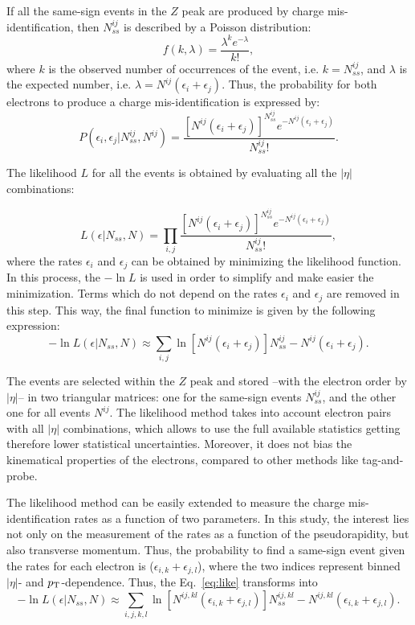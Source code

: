 If all the same-sign events in the $Z$ peak are produced by charge mis-identification, then $N^{ij}_{ss}$ is described by a Poisson distribution:
\begin{equation}
f(k,\lambda)=\frac{\lambda^k e^{-\lambda}}{k!},
\end{equation}
where $k$ is the observed number of occurrences of the event, i.e. $k=N^{ij}_{ss}$, and $\lambda$ is the expected number,  i.e. $\lambda=N^{ij}(\epsilon_i+\epsilon_j)$. Thus, the probability for both electrons to produce a charge mis-identification is expressed by:
\begin{equation}
P(\epsilon_i,\epsilon_j|N^{ij}_{ss},N^{ij})=\frac{[N^{ij}(\epsilon_i+\epsilon_j)]^{N_{ss}^{ij}}e^{-N^{ij}(\epsilon_i+\epsilon_j)}}{N^{ij}_{ss}!}.
\end{equation}

The likelihood $L$ for all the events is obtained by evaluating all the $|\eta|$ combinations:

\begin{equation}
L(\epsilon|N_{ss},N)=\prod_{i,j}\frac{[N^{ij}(\epsilon_i+\epsilon_j)]^{N_{ss}^{ij}}e^{-N^{ij}(\epsilon_i+\epsilon_j)}}{N^{ij}_{ss}!},
\end{equation}
where the rates $\epsilon_i$ and $\epsilon_j$ can be obtained by minimizing the likelihood function. In this process, the $-\ln L$ is used in order to simplify and make easier the minimization. Terms which do not depend on the rates $\epsilon_i$ and $\epsilon_j$ are removed in this step. This way, the final function to minimize is given by the following expression:
\begin{equation}
\label{eq:like}
-\ln L(\epsilon|N_{ss},N)\approx \sum_{i,j}\ln[N^{ij}(\epsilon_i+\epsilon_j)]N^{ij}_{ss}-N^{ij}(\epsilon_i+\epsilon_j).
\end{equation}

The events are selected within the $Z$ peak and stored --with the electron order by $|\eta|$-- in two triangular matrices: one for the same-sign events $N^{ij}_{ss}$,  and the other one for all events $N^{ij}$. The likelihood method takes into account
electron pairs with all $|\eta|$ combinations, which allows to use the full available statistics  getting therefore lower statistical uncertainties. Moreover, it does not bias the kinematical properties of the
electrons, compared to other methods like tag-and-probe.

The likelihood  method can be easily extended to measure the charge mis-identification rates as a function of  two parameters. In this study, the interest lies not only on the measurement of the rates   as a function of the pseudorapidity, but also transverse momentum. Thus, the probability to find a same-sign event given the rates for each electron is ($\epsilon_{i,k}+\epsilon_{j,l}$), where the two indices represent binned $|\eta|$- and $p_{\rm T}$-dependence. Thus, the Eq.~\ref{eq:like} transforms into
\begin{equation}
-\ln L(\epsilon|N_{ss},N)\approx \sum_{i,j,k,l}\ln[N^{ij,kl}(\epsilon_{i,k}+\epsilon_{j,l})]N^{ij,kl}_{ss}-N^{ij,kl}(\epsilon_{i,k}+\epsilon_{j,l}).
\end{equation}   

